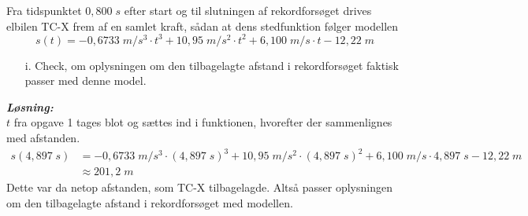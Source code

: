 \documentclass{report}
\newcommand{\sol}{\setlength{\parindent}{0cm}\textbf{\textit{Løsning:}}\setlength{\parindent}{1cm}}
\begin{document}
\begin{question}{}{}
  Fra tidspunktet $0,800\;\unit{s}$ efter start og til slutningen af rekordforsøget drives elbilen TC-X frem af en samlet kraft, sådan at dens stedfunktion følger modellen
\[
  s(t)=-0,6733\;\unit{m/s^3} \cdot t^3+10,95\;\unit{m/s^2} \cdot t^2+6,100\;\unit{m/s}\cdot t - 12,22\;\unit{m}
\] 
\begin{itemize}
  \item[i.] Check, om oplysningen om den tilbagelagte afstand i rekordforsøget faktisk passer med denne model.
\end{itemize}
\end{question}
\sol  \\ 
$t$ fra opgave 1 tages blot og sættes ind i funktionen, hvorefter der sammenlignes med afstanden.
\begin{equation*}
\begin{split}
s(4,897 \;\unit{s} )&= -0,6733\;\unit{m/s^3} \cdot (4,897 \;\unit{s})^3+10,95\;\unit{m/s^2} \cdot (4,897 \;\unit{s})^2+6,100\;\unit{m/s}\cdot 4,897 \;\unit{s}  - 12,22\;\unit{m}\\ 
&\approx 201,2 \;\unit{m} 
\end{split}
\end{equation*}
Dette var da netop afstanden, som TC-X tilbagelagde. Altså passer oplysningen om den tilbagelagte afstand i rekordforsøget med modellen.
\end{document}
